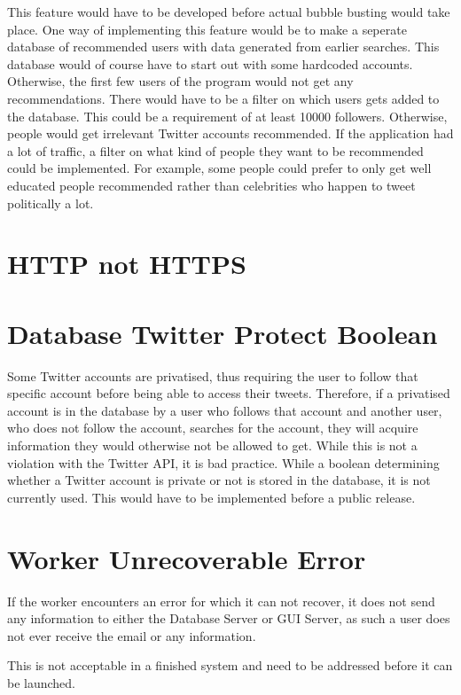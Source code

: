 This feature would have to be developed before actual bubble busting would take
place. One way of implementing this feature would be to make a seperate
database of recommended users with data generated from earlier searches. This
database would of course have to start out with some hardcoded accounts.
Otherwise, the first few users of the program would not get any
recommendations. There would have to be a filter on which users gets added to
the database. This could be a requirement of at least 10000 followers.
Otherwise, people would get irrelevant Twitter accounts recommended. If the
application had a lot of traffic, a filter on what kind of people they want to
be recommended could be implemented. For example, some people could prefer to
only get well educated people recommended rather than celebrities who happen to
tweet politically a lot.


\section*{HTTP not HTTPS}

\section{Database Twitter Protect Boolean}\label{sec:twitterProtect}
Some Twitter accounts are privatised, thus requiring the user to follow that
specific account before being able to access their tweets. Therefore, if a
privatised account is in the database by a user who follows that account and
another user, who does not follow the account, searches for the account, they
will acquire information they would otherwise not be allowed to get. While this
is not a violation with the Twitter API, it is bad practice. While a boolean
determining whether a Twitter account is private or not is stored in the
database, it is not currently used. This would have to be implemented before a
public release.

\section{Worker Unrecoverable Error}
If the worker encounters an error for which it can not recover, it does not send
any information to either the Database Server or GUI Server, as such a user does
not ever receive the email or any information. \nl

This is not acceptable in a finished system and need to be addressed before it
can be launched.

